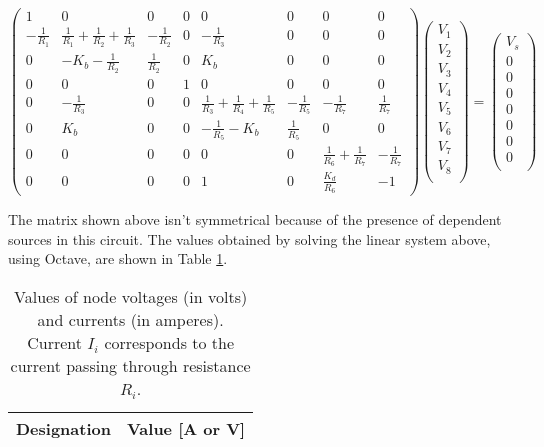 \begin{equation}
  \begin{pmatrix}
    1 & 0 & 0 & 0 & 0 & 0 & 0 & 0 \\
    -\frac{1}{R_1} & \frac{1}{R_1}+\frac{1}{R_2}+\frac{1}{R_3} & -\frac{1}{R_2} & 0 & -\frac{1}{R_3} & 0 & 0 & 0 \\
    0 & -K_b-\frac{1}{R_2} & \frac{1}{R_2} & 0 & K_b & 0 & 0 & 0 \\
    0 & 0 & 0 & 1 & 0 & 0 & 0 & 0 \\
    0 & -\frac{1}{R_3} & 0 & 0 & \frac{1}{R_3}+\frac{1}{R_4}+\frac{1}{R_5} & -\frac{1}{R_5} & -\frac{1}{R_7} & \frac{1}{R_7} \\
    0 & K_b & 0 & 0 & -\frac{1}{R_5}-K_b & \frac{1}{R_5} & 0 & 0 \\
    0 & 0 & 0 & 0 & 0 & 0 & \frac{1}{R_6}+\frac{1}{R_7} & -\frac{1}{R_7} \\
    0 & 0 & 0 & 0 & 1 & 0 & \frac{K_d}{R_6} & -1
  \end{pmatrix}
  \begin{pmatrix}
    V_1  \\
    V_2  \\
    V_3  \\
    V_4  \\
    V_5  \\
    V_6  \\
    V_7  \\
    V_8  \\
  \end{pmatrix}
  =
  \begin{pmatrix}
    V_s \\
    0   \\
    0   \\
    0   \\
    0   \\
    0   \\
    0   \\
    0   \\
  \end{pmatrix}
  \label{eq:Exercise1LinearSystem}
\end{equation}

The matrix shown above isn't symmetrical because of the presence of dependent sources in this circuit. The values obtained by solving the linear system above, using Octave, are shown in Table \ref{tab:Exercise1Theoretical}.

\begin{table}[H]
  \centering
  \begin{tabular}{|c|c|}
    \hline
        {\bf Designation} & {\bf Value [A or V]} \\ \hline
        
  \end{tabular}
  \caption{Values of node voltages (in volts) and currents (in amperes). Current $I_i$ corresponds to the current passing through resistance $R_i$.}
  \label{tab:Exercise1Theoretical}
\end{table}



